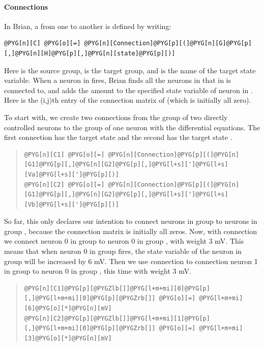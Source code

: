 \documentclass[letterpaper,10pt,english]{manual}
\begin{document}
\paragraph{Connections}

In Brian, a \hyperlink{brian.Connection}{} from one \hyperlink{brian.NeuronGroup}{} to another is
defined by writing:

\begin{Verbatim}[commandchars=@\[\]]
@PYG[n][C] @PYG[o][=] @PYG[n][Connection]@PYG[p][(]@PYG[n][G]@PYG[p][,]@PYG[n][H]@PYG[p][,]@PYG[n][state]@PYG[p][)]
\end{Verbatim}

Here  is the source group,  is the target group, and  is the
name of the target state variable. When a neuron  in  fires, Brian
finds all the neurons  in  that  in  is connected to, and adds
the amount  to the specified state variable of neuron  in .
Here  is the (i,j)th entry of the connection matrix of  (which
is initially all zero).

To start with, we create two connections from the group of two
directly controlled neurons to the group of one neuron with the
differential equations. The first connection has the target state 
and the second has the target state .
\begin{quote}

\begin{Verbatim}[commandchars=@\[\]]
@PYG[n][C1] @PYG[o][=] @PYG[n][Connection]@PYG[p][(]@PYG[n][G1]@PYG[p][,]@PYG[n][G2]@PYG[p][,]@PYG[l+s][']@PYG[l+s][Va]@PYG[l+s][']@PYG[p][)]
@PYG[n][C2] @PYG[o][=] @PYG[n][Connection]@PYG[p][(]@PYG[n][G1]@PYG[p][,]@PYG[n][G2]@PYG[p][,]@PYG[l+s][']@PYG[l+s][Vb]@PYG[l+s][']@PYG[p][)]
\end{Verbatim}
\end{quote}

So far, this only declares our intention to connect neurons in group
 to neurons in group , because the connection matrix is initially
all zeros. Now, with connection  we connect neuron 0 in group 
to neuron 0 in group , with weight 3 mV. This means that when neuron
0 in group  fires, the state variable  of the neuron in group 
will be increased by 6 mV. Then we use connection  to connection
neuron 1 in group  to neuron 0 in group , this time with weight
3 mV.
\begin{quote}

\begin{Verbatim}[commandchars=@\[\]]
@PYG[n][C1]@PYG[p][@PYGZlb[]]@PYG[l+m+mi][0]@PYG[p][,]@PYG[l+m+mi][0]@PYG[p][@PYGZrb[]] @PYG[o][=] @PYG[l+m+mi][6]@PYG[o][*]@PYG[n][mV]
@PYG[n][C2]@PYG[p][@PYGZlb[]]@PYG[l+m+mi][1]@PYG[p][,]@PYG[l+m+mi][0]@PYG[p][@PYGZrb[]] @PYG[o][=] @PYG[l+m+mi][3]@PYG[o][*]@PYG[n][mV]
\end{Verbatim}
\end{quote}
\end{document}
